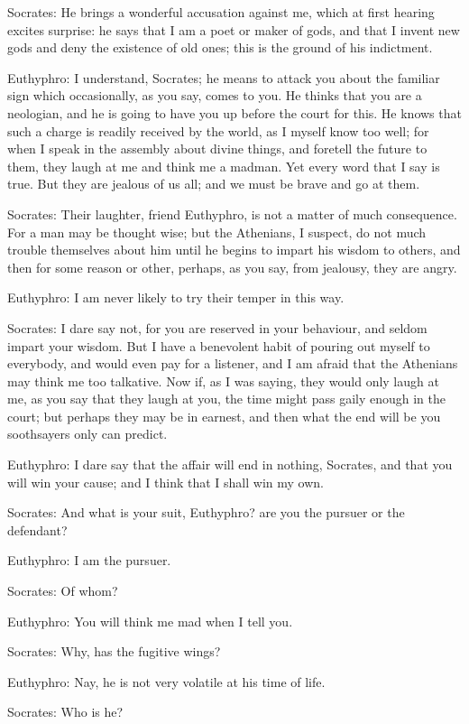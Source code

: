 Socrates: He brings a wonderful accusation against me, which at first hearing excites surprise: he says that I am a poet or maker of gods, and that I invent new gods and deny the existence of old ones; this is the ground of his indictment.

Euthyphro: I understand, Socrates; he means to attack you about the familiar sign which occasionally, as you say, comes to you. He thinks that you are a neologian, and he is going to have you up before the court for this. He knows that such a charge is readily received by the world, as I myself know too well; for when I speak in the assembly about divine things, and foretell the future to them, they laugh at me and think me a madman. Yet every word that I say is true. But they are jealous of us all; and we must be brave and go at them.

Socrates: Their laughter, friend Euthyphro, is not a matter of much consequence. For a man may be thought wise; but the Athenians, I suspect, do not much trouble themselves about him until he begins to impart his wisdom to others, and then for some reason or other, perhaps, as you say, from jealousy, they are angry.

Euthyphro: I am never likely to try their temper in this way.

Socrates: I dare say not, for you are reserved in your behaviour, and seldom impart your wisdom. But I have a benevolent habit of pouring out myself to everybody, and would even pay for a listener, and I am afraid that the Athenians may think me too talkative. Now if, as I was saying, they would only laugh at me, as you say that they laugh at you, the time might pass gaily enough in the court; but perhaps they may be in earnest, and then what the end will be you soothsayers only can predict.

Euthyphro: I dare say that the affair will end in nothing, Socrates, and that you will win your cause; and I think that I shall win my own.

Socrates: And what is your suit, Euthyphro? are you the pursuer or the defendant?

Euthyphro: I am the pursuer.

Socrates: Of whom?

Euthyphro: You will think me mad when I tell you.

Socrates: Why, has the fugitive wings?

Euthyphro: Nay, he is not very volatile at his time of life.

Socrates: Who is he?

